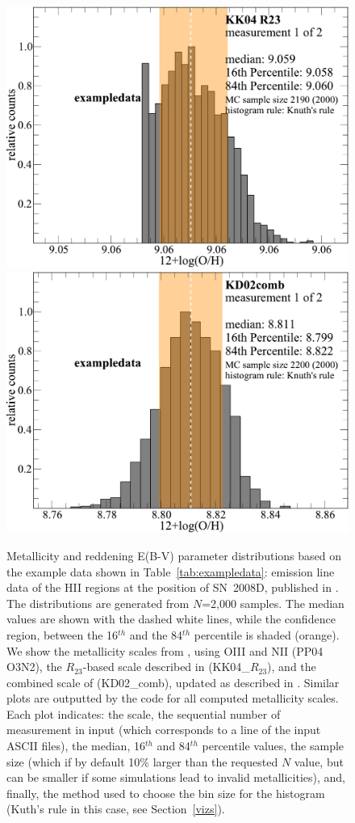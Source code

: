 \documentclass{emulateapj}
\begin{document}
\begin{figure}[!ht]
\centerline{
\includegraphics[width=0.98\columnwidth]{exampledata_n2000_KK04_R23_1.pdf}
\includegraphics[width=0.98\columnwidth]{exampledata_n2000_KD02comb_1.pdf}}
\caption{Metallicity and reddening E(B-V) parameter distributions based on the example data shown in Table~\ref{tab:exampledata}: emission line data of the HII regions at the position of SN~2008D, published in \citet{modjaz11}. The distributions are generated from $N$=2,000 samples. The median values are shown with the dashed white lines, while the confidence region, between the 16$^{th}$ and the 84$^{th}$ percentile is shaded (orange). We show the metallicity scales from \citet{pettini04}, using OIII and NII  (PP04 O3N2), the $R_{23}$-based scale described in \citet{kobulnicky04} (KK04\_$R_{23}$), and the combined scale of \citet{kewley02} (KD02\_comb), updated as described in \citet{kewley08}. Similar plots are outputted by the code for all computed metallicity scales. Each plot indicates: the scale, the sequential number of measurement in input (which corresponds to a line of the input ASCII files), the median, 16$^{th}$  and 84$^{th}$  percentile values, the sample size (which if by default 10\% larger than the requested $N$ value, but can be smaller if some simulations lead to invalid metallicities), and, finally, the method used to choose the bin size for the histogram (Kuth's rule in this case, see Section~\ref{vizs}).}

\end{figure}
\end{document}
